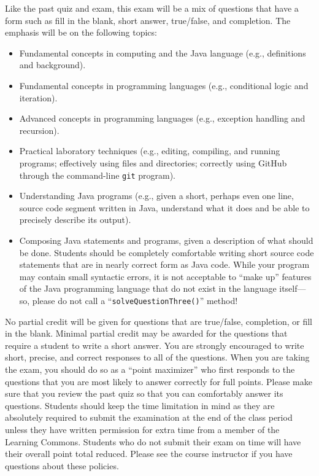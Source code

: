 \documentclass[11pt]{article}
\begin{document}
\noindent Like the past quiz and exam, this exam will be a mix of questions that have a form such as fill in the
blank, short answer, true/false, and completion. The emphasis will be on the following topics:

\vspace*{-.05in}
\begin{itemize}

  \itemsep 0in

  \item Fundamental concepts in computing and the Java language (e.g., definitions and background).

  \item Fundamental concepts in programming languages (e.g., conditional logic and iteration).

  \item Advanced concepts in programming languages (e.g., exception handling and recursion).

  \item Practical laboratory techniques (e.g., editing, compiling, and running programs; effectively using files and
    directories; correctly using GitHub through the command-line {\tt git} program).

  \item Understanding Java programs (e.g., given a short, perhaps even one line, source code segment written in Java,
    understand what it does and be able to precisely describe its output).

  \item Composing Java statements and programs, given a description of what should be done. Students should be completely
    comfortable writing short source code statements that are in nearly correct form as Java code. While your program may
    contain small syntactic errors, it is not acceptable to ``make up'' features of the Java programming language that do
    not exist in the language itself---so, please do not call a ``{\tt solveQuestionThree()}'' method!

\end{itemize}

\noindent No partial credit will be given for questions that are true/false, completion, or fill in the blank. Minimal
partial credit may be awarded for the questions that require a student to write a short answer. You are strongly
encouraged to write short, precise, and correct responses to all of the questions. When you are taking the exam, you
should do so as a ``point maximizer'' who first responds to the questions that you are most likely to answer correctly
for full points. Please make sure that you review the past quiz so that you can comfortably answer its questions.
Students should keep the time limitation in mind as they are absolutely required to submit the examination at the end of
the class period unless they have written permission for extra time from a member of the Learning Commons. Students who
do not submit their exam on time will have their overall point total reduced. Please see the course instructor if you
have questions about these policies.
\end{document}
